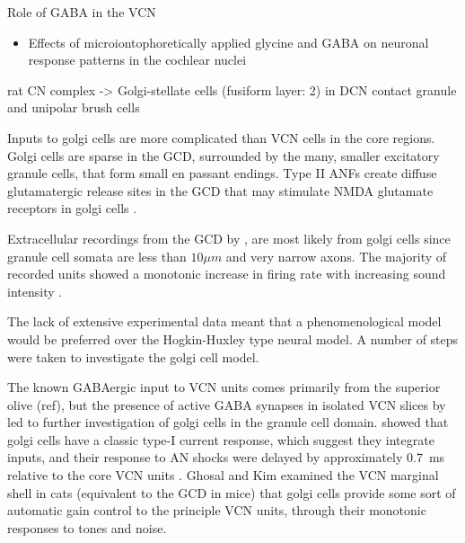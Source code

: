 \medskip{}

Role of GABA in the VCN
\begin{itemize}
\item Effects of microiontophoretically applied glycine and {GABA} on
  neuronal response patterns in the cochlear nuclei
  \citep{CasparyHaveyEtAl:1979}
\end{itemize}

\citep{Alibardi:2003a} rat CN complex -> Golgi-stellate cells
(fusiform layer: 2) in DCN contact granule and unipolar brush cells


\medskip{}

Inputs to golgi cells are more complicated than VCN cells in the core
regions. Golgi cells are sparse in the GCD, surrounded by the many,
smaller excitatory granule cells, that form small en passant
endings. Type II ANFs create diffuse glutamatergic release sites in
the GCD \citep{HurdHutsonEtAl:1999,BensonBrown:2004} that may
stimulate NMDA glutamate receptors in golgi cells
\citep{FerragamoGoldingEtAl:1998a}.

\medskip{}

Extracellular recordings from the GCD by \citet{GhoshalKim:1997}, are most likely from golgi
cells since granule cell somata are less than  $10 \mu m$ and very
narrow axons. The majority of recorded
units showed a monotonic increase in firing rate with increasing sound
intensity \citep{GhoshalKim:1997}. 


\medskip{}

The lack of extensive experimental data meant that a phenomenological model
would be preferred over the Hogkin-Huxley type neural model. A number of steps
were taken to investigate the golgi cell model.

\medskip{}

The known GABAergic input to VCN units comes primarily from the superior olive
(ref), but the presence of active GABA synapses in isolated VCN slices by
\citet{FerragamoGoldingEtAl:1998} led to further investigation of
golgi cells in the granule cell domain. \citet{FerragamoGoldingEtAl:1998a}
showed that golgi cells have a classic type-I current
response, which suggest they integrate inputs, and their response to
AN shocks were delayed by approximately 0.7~ms relative to the core
VCN units .  Ghosal and Kim
\citet{GhoshalKim:1997} examined the VCN marginal shell in cats (equivalent to the
GCD in mice) that golgi cells provide some sort of
automatic gain control to the principle VCN units, through their monotonic
responses to tones and noise.

